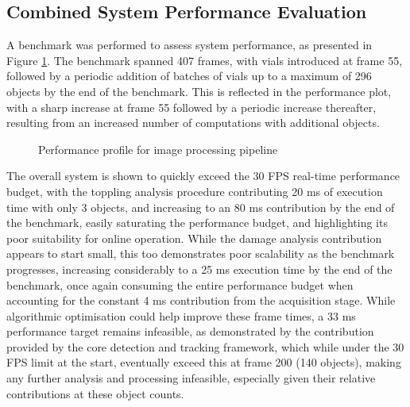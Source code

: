 \documentclass[10pt]{article}
\begin{document}
\subsection{Combined System Performance Evaluation}
A benchmark was performed to assess system performance, as presented in Figure \ref{fig:Overall_Performance_Profile}. The benchmark spanned 407 frames, with vials introduced at frame 55, followed by a periodic addition of batches of vials up to a maximum of 296 objects by the end of the benchmark. This is reflected in the performance plot, with a sharp increase at frame 55 followed by a periodic increase thereafter, resulting from an increased number of computations with additional objects.

\clearpage
\begin{figure}[ht]
    \begin{center}
        \resizebox{0.65\textwidth}{!}{
            
        }
    \end{center}
    \vspace{-0.3cm}
    \caption{Performance profile for image processing pipeline}
    \label{fig:Overall_Performance_Profile}
\end{figure}

The overall system is shown to quickly exceed the 30 FPS real-time performance budget, with the toppling analysis procedure contributing 20 ms of execution time with only 3 objects, and increasing to an 80 ms contribution by the end of the benchmark, easily saturating the performance budget, and highlighting its poor suitability for online operation. While the damage analysis contribution appears to start small, this too demonstrates poor scalability as the benchmark progresses, increasing considerably to a 25 ms execution time by the end of the benchmark, once again consuming the entire performance budget when accounting for the constant 4 ms contribution from the acquisition stage. While algorithmic optimisation could help improve these frame times, a 33 ms performance target remains infeasible, as demonstrated by the contribution provided by the core detection and tracking framework, which while under the 30 FPS limit at the start, eventually exceed this at frame 200 (140 objects), making any further analysis and processing infeasible, especially given their relative contributions at these object counts.
\end{document}
